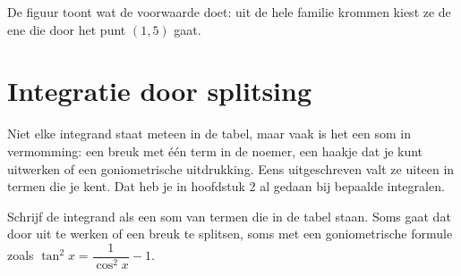 De figuur toont wat de voorwaarde doet: uit de hele familie krommen kiest ze de ene die door het punt $(1, 5)$ gaat.


\begin{oefeningen}
\end{oefeningen}

\section{Integratie door splitsing}

Niet elke integrand staat meteen in de tabel, maar vaak is het een som in vermomming: een breuk met één term in de noemer, een haakje dat je kunt uitwerken of een goniometrische uitdrukking. Eens uitgeschreven valt ze uiteen in termen die je kent. Dat heb je in hoofdstuk 2 al gedaan bij bepaalde integralen.



\begin{werkwijze}
Schrijf de integrand als een som van termen die in de tabel staan. Soms gaat dat door uit te werken of een breuk te splitsen, soms met een goniometrische formule zoals $\tan^2 x = \dfrac{1}{\cos^2 x} - 1$.
\end{werkwijze}

